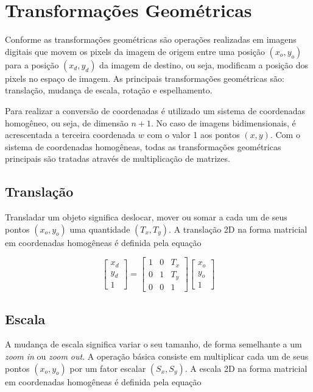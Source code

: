 \documentclass[12pt,oneside,a4paper,english,french,spanish,brazil,]{abntex2}
\begin{document}
\section{Transformações Geométricas}

Conforme \citet{conci:2003} as transformações geométricas são operações realizadas em imagens digitais que movem os pixels da imagem de origem entre uma posição \((x_o,y_o)\) para a posição \((x_d,y_d)\) da imagem de destino, ou seja, modificam a posição dos pixels no espaço de imagem. As principais transformações geométricas são: translação, mudança de escala, rotação e espelhamento.

Para realizar a conversão de coordenadas é utilizado um sistema de coordenadas homogêneo, ou seja, de dimensão \(n+1\). No caso de imagens bidimensionais, é acrescentada a terceira coordenada \(w\) com o valor 1 aos pontos \((x, y)\). Com o sistema de coordenadas homogêneas, todas as transformações geométricas principais são tratadas através de multiplicação de matrizes.

\subsection{Translação}

Transladar um objeto significa deslocar, mover ou somar a cada um de seus pontos \((x_o,y_o)\) uma quantidade \((T_x,T_y)\). A translação 2D na forma matricial em coordenadas homogêneas é definida pela equação

\[
\begin{bmatrix}
x_d\\ 
y_d\\ 
1
\end{bmatrix}
=
\begin{bmatrix}
1 & 0 & T_x\\ 
0 & 1 & T_y\\ 
0 & 0 & 1
\end{bmatrix}
\begin{bmatrix}
x_o\\ 
y_o\\ 
1
\end{bmatrix}
\]

\subsection{Escala}

A mudança de escala significa variar o seu tamanho, de forma semelhante a um \textit{zoom in} ou \textit{zoom out}. A operação básica consiste em multiplicar cada um de seus pontos \((x_o,y_o)\) por um fator escalar \((S_x,S_y)\). A escala 2D na forma matricial em coordenadas homogêneas é definida pela equação
\end{document}
